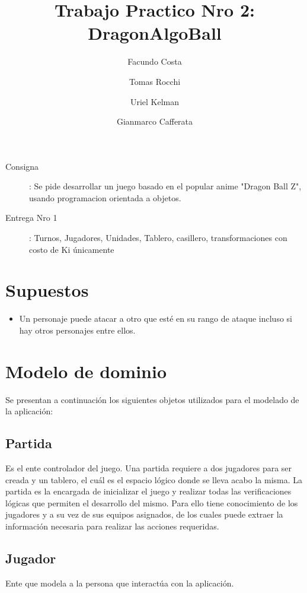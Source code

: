 \documentclass[a4paper]{article}
\title{Trabajo Practico Nro 2: DragonAlgoBall}
\author{ Facundo Costa \and Tomas Rocchi\and Uriel Kelman \and Gianmarco Cafferata}
\begin{document}
\maketitle

\begin{description}

\item [Consigna]: Se pide desarrollar un juego basado en el popular anime "Dragon Ball Z", usando programacion orientada a objetos.

\item [Entrega Nro 1]: Turnos, Jugadores, Unidades, Tablero, casillero, transformaciones con costo de Ki
únicamente

\end{description}




\newpage
\section{Supuestos}

\begin{itemize}

\item Un personaje puede atacar a otro que esté en su rango de ataque incluso si hay otros personajes entre ellos.


\end{itemize}




\section{Modelo de dominio}

Se presentan a continuación los siguientes objetos utilizados para el modelado de la aplicación: 

\subsection{Partida} Es el ente controlador del juego. Una partida requiere a dos jugadores para ser creada y un tablero, el cuál es el espacio lógico donde se lleva acabo la misma. La partida es la encargada de inicializar el juego y realizar todas las verificaciones lógicas que permiten el desarrollo del mismo. Para ello tiene conocimiento de los jugadores y a su vez de sus equipos asignados, de los cuales puede extraer la información necesaria para realizar las acciones requeridas.

\subsection{Jugador}
Ente que modela a la persona que interactúa con la aplicación.
\end{document}
